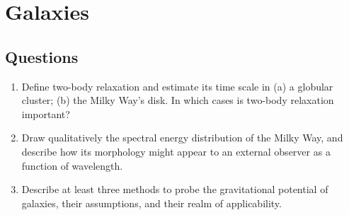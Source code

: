 \section{Galaxies}
\subsection{Questions}
\begin{enumerate}
\item Define two-body relaxation and estimate its time scale in (a) a globular cluster; (b)
      the Milky Way's disk. In which cases is two-body relaxation important?
\item Draw qualitatively the spectral energy distribution of the Milky Way, and describe
      how its morphology might appear to an external observer as a function of wavelength.
\item Describe at least three methods to probe the gravitational potential of galaxies,
      their assumptions, and their realm of applicability.
\end{enumerate}
